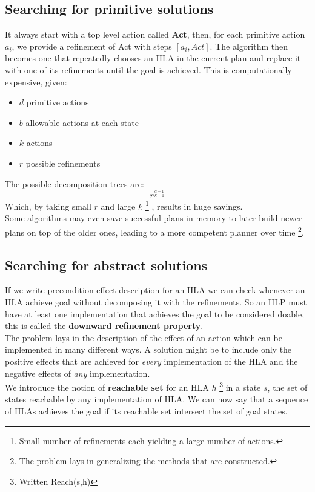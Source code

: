 \documentclass[5pt,a4paper]{article}
\begin{document}
\subsection{Searching for primitive solutions}
It always start with a top level action called \textbf{Act}, then, for each primitive action $a_i$, we provide a refinement of Act with steps $[a_i,Act]$. The algorithm then becomes one that repeatedly chooses an HLA in the current plan and replace it with one of its refinements until the goal is achieved. This is computationally expensive, given:
\begin{itemize}
\item $d$ primitive actions
\item $b$ allowable actions at each state
\item $k$ actions 
\item $r$ possible refinements
\end{itemize}


The possible decomposition trees are:
\[r^{\frac{d-1}{k-1}}\]
Which, by taking small $r$ and large $k$ \footnote{Small number of refinements each yielding a large number of actions.} , results in huge savings.\\
Some algorithms may even save successful plans in memory to later build newer plans on top of the older ones, leading to a more competent planner over time \footnote{The problem lays in generalizing the methods that are constructed.}.

\subsection{Searching for abstract solutions}
If we write precondition-effect description for an HLA we can check whenever an HLA achieve goal without decomposing it with the refinements. So an HLP must have at least one implementation that achieves the goal to be considered doable, this is called the \textbf{downward refinement property}.\\
The problem lays in the description of the effect of an action which can be implemented in many different ways. A solution might be to include only the positive effects that are achieved for \textit{every} implementation of the HLA and the negative effects of \textit{any} implementation.\\
We introduce the notion of \textbf{reachable set} for an HLA $h$ \footnote{Written Reach(s,h)} in a state $s$, the set of states reachable by any implementation of HLA. We can now say that a sequence of HLAs achieves the goal if its reachable set intersect the set of goal states.
\end{document}
